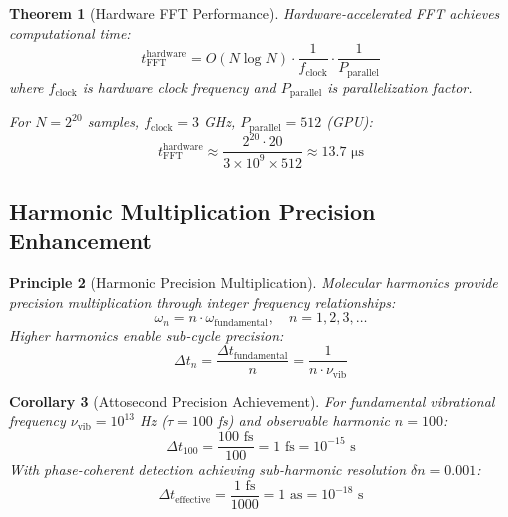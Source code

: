 \documentclass[12pt,a4paper]{article}
\newtheorem{theorem}{Theorem}[section]
\newtheorem{corollary}[theorem]{Corollary}
\newtheorem{principle}[theorem]{Principle}
\begin{document}
\begin{theorem}[Hardware FFT Performance]
Hardware-accelerated FFT achieves computational time:
\begin{equation}
t_{\text{FFT}}^{\text{hardware}} = O(N \log N) \cdot \frac{1}{f_{\text{clock}}} \cdot \frac{1}{P_{\text{parallel}}}
\end{equation}
where $f_{\text{clock}}$ is hardware clock frequency and $P_{\text{parallel}}$ is parallelization factor.

For $N = 2^{20}$ samples, $f_{\text{clock}} = 3$ GHz, $P_{\text{parallel}} = 512$ (GPU):
\begin{equation}
t_{\text{FFT}}^{\text{hardware}} \approx \frac{2^{20} \cdot 20}{3 \times 10^9 \times 512} \approx 13.7 \text{ μs}
\end{equation}
\end{theorem}

\subsection{Harmonic Multiplication Precision Enhancement}

\begin{principle}[Harmonic Precision Multiplication]
Molecular harmonics provide precision multiplication through integer frequency relationships:
\begin{equation}
\omega_n = n \cdot \omega_{\text{fundamental}}, \quad n = 1, 2, 3, \ldots
\end{equation}
Higher harmonics enable sub-cycle precision:
\begin{equation}
\Delta t_n = \frac{\Delta t_{\text{fundamental}}}{n} = \frac{1}{n \cdot \nu_{\text{vib}}}
\end{equation}
\end{principle}

\begin{corollary}[Attosecond Precision Achievement]
For fundamental vibrational frequency $\nu_{\text{vib}} = 10^{13}$ Hz ($\tau = 100$ fs) and observable harmonic $n = 100$:
\begin{equation}
\Delta t_{100} = \frac{100 \text{ fs}}{100} = 1 \text{ fs} = 10^{-15} \text{ s}
\end{equation}
With phase-coherent detection achieving sub-harmonic resolution $\delta n = 0.001$:
\begin{equation}
\Delta t_{\text{effective}} = \frac{1 \text{ fs}}{1000} = 1 \text{ as} = 10^{-18} \text{ s}
\end{equation}
\end{corollary}
\end{document}

